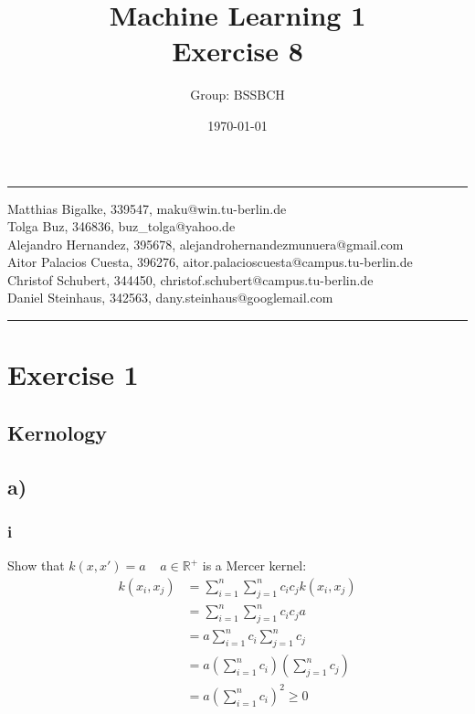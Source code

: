\documentclass{article}
\title{Machine Learning 1 \\ Exercise 8} %
\author{Group: BSSBCH} %
\date{\today} %
\begin{document}
\maketitle %
\noindent\rule[0.5ex]{\linewidth}{1pt}
Matthias Bigalke, 339547, maku@win.tu-berlin.de \\
Tolga Buz, 346836, buz\_tolga@yahoo.de \\
Alejandro Hernandez, 395678, alejandrohernandezmunuera@gmail.com \\
Aitor Palacios Cuesta, 396276, aitor.palacioscuesta@campus.tu-berlin.de \\
Christof Schubert, 344450, christof.schubert@campus.tu-berlin.de \\
Daniel Steinhaus, 342563, dany.steinhaus@googlemail.com\\
\noindent\rule[0.5ex]{\linewidth}{1pt}


\section*{Exercise 1}

\subsection*{Kernology}

\subsection*{a)}

\subsubsection*{i}

Show that
$k(x,x') = a \ \ \ \ \ a \in \mathbb{R}^+$ is a Mercer kernel:\\

\begin{align}
k(x_i,x_j) &= \sum_{i=1}^n \sum_{j=1}^n c_i c_j k(x_i,x_j) \\
&= \sum_{i=1}^n \sum_{j=1}^n c_i c_j a \\ 
&= a \sum_{i=1}^n c_i \sum_{j=1}^n c_j \\ 
&= a (\sum_{i=1}^n c_i) (\sum_{j=1}^n c_j) \\ 
&= a (\sum_{i=1}^n c_i)^2 \geq 0
\end{align}
\end{document}
